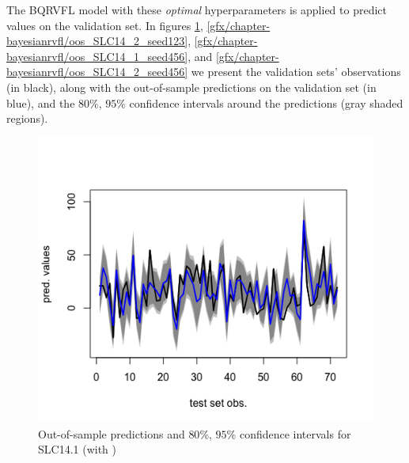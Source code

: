 The BQRVFL model with these \textit{optimal} hyperparameters is applied to predict values on the validation set. In figures \ref{oos_SLC14_1_seed123}, \ref{gfx/chapter-bayesianrvfl/oos_SLC14_2_seed123}, \ref{gfx/chapter-bayesianrvfl/oos_SLC14_1_seed456}, and \ref{gfx/chapter-bayesianrvfl/oos_SLC14_2_seed456} we present the validation sets' observations (in black), along with the out-of-sample predictions on the validation set (in blue), and the $80\%$, $95\%$ confidence intervals around the predictions (gray shaded regions).

\begin{figure}[!htb]
    \centering
    \begin{minipage}{.5\textwidth}
        \centering
        \includegraphics[width=1.064\linewidth, height=0.35\textheight]{gfx/chapter-bayesianrvfl/SLC14_1.png}
        \caption{Out-of-sample predictions and $80$\%, $95$\% confidence intervals for SLC14.1 (with )}
        \label{oos_SLC14_1_seed123}
    \end{minipage}%
    \begin{minipage}{0.5\textwidth}
        \centering

\end{minipage}
\end{figure}
